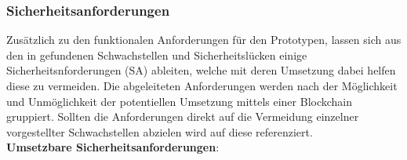 \subsubsection{Sicherheitsanforderungen}
\label{sec:prototype_sec}
    Zusätzlich zu den funktionalen Anforderungen für den Prototypen, lassen sich aus den in  gefundenen Schwachstellen und Sicherheitslücken einige Sicherheitsnforderungen (SA) ableiten, welche mit deren Umsetzung dabei helfen diese zu vermeiden.
    Die abgeleiteten Anforderungen werden nach der Möglichkeit und Unmöglichkeit der potentiellen Umsetzung mittels einer Blockchain gruppiert.
    Sollten die Anforderungen direkt auf die Vermeidung einzelner vorgestellter Schwachstellen abzielen wird auf diese referenziert.
    \bigskip\\
    \noindent \textbf{Umsetzbare Sicherheitsanforderungen}:
